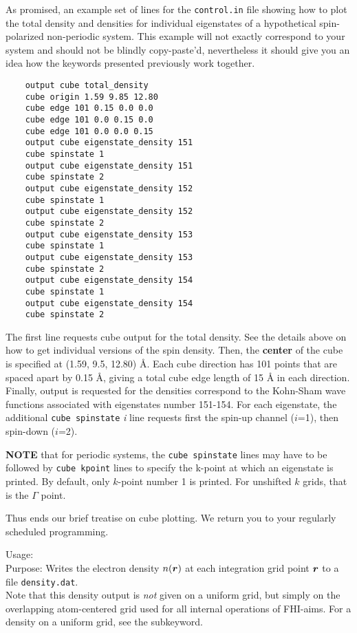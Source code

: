 As promised, an example set of lines for the \texttt{control.in} file showing how
to plot the total density and densities for individual eigenstates of a hypothetical
spin-polarized non-periodic system.  This example will not exactly correspond
to your system and should not be blindly copy-paste'd, nevertheless it should give
you an idea how the keywords presented previously work together.
\begin{verbatim}
    output cube total_density
    cube origin 1.59 9.85 12.80
    cube edge 101 0.15 0.0 0.0
    cube edge 101 0.0 0.15 0.0
    cube edge 101 0.0 0.0 0.15
    output cube eigenstate_density 151
    cube spinstate 1
    output cube eigenstate_density 151
    cube spinstate 2
    output cube eigenstate_density 152
    cube spinstate 1
    output cube eigenstate_density 152
    cube spinstate 2
    output cube eigenstate_density 153
    cube spinstate 1
    output cube eigenstate_density 153
    cube spinstate 2
    output cube eigenstate_density 154
    cube spinstate 1
    output cube eigenstate_density 154
    cube spinstate 2
\end{verbatim}
The first line requests cube output for the total density. See the
details above on how to get individual versions of the spin
density. Then, the \textbf{center} of the cube is specified at (1.59,
9.5, 12.80) {\AA}. Each cube direction has 101 points that are spaced
apart by 0.15 {\AA}, giving a total cube edge length of 15 {\AA} in
each direction. Finally, output is requested for the densities correspond to
the Kohn-Sham wave functions associated with eigenstates number 151-154. For
each eigenstate, the additional \texttt{cube spinstate} \emph{i} line requests
first the spin-up channel ($i$=1), then spin-down ($i$=2).

\textbf{NOTE} that for periodic systems, the \texttt{cube spinstate} lines
may have to be followed by \texttt{cube kpoint} lines to specify the k-point
at which an eigenstate is printed. By default, only $k$-point number 1 is printed.
For unshifted $k$ grids, that is the $\Gamma$ point.

Thus ends our brief treatise on cube plotting.  We return you to your regularly
scheduled programming.

{
  \noindent
  Usage:   \\[1.0ex]
  Purpose: Writes the electron density $n(\mbox{\boldmath$r$})$
    at each integration grid point $\mbox{\boldmath$r$}$ to a file
  \texttt{density.dat}. \\[1.0ex]
}
Note that this density output is \emph{not} given on a uniform grid,
but simply on the overlapping atom-centered grid used for all internal
operations of FHI-aims. For a density on a uniform grid, see the
  subkeyword.

